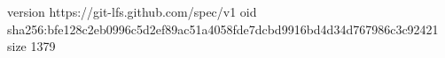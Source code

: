 version https://git-lfs.github.com/spec/v1
oid sha256:bfe128c2eb0996c5d2ef89ac51a4058fde7dcbd9916bd4d34d767986c3c92421
size 1379
